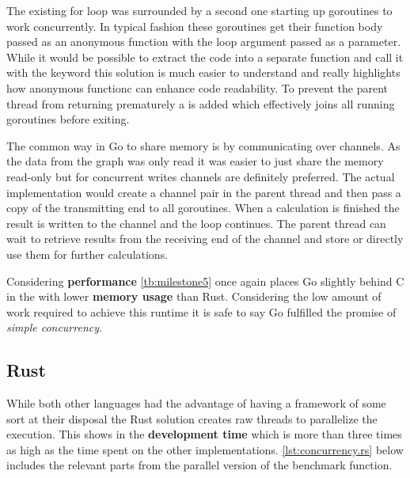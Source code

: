 The existing for loop was surrounded by a second one starting up \glspl{goroutine} to work concurrently. In typical fashion these \glspl{goroutine} get their function body passed as an anonymous function with the loop argument passed as a parameter. While it would be possible to extract the code into a separate function and call it with the  keyword this solution is much easier to understand and really highlights how anonymous functionc can enhance code readability. To prevent the parent thread from returning prematurely a  is added which effectively joins all running \glspl{goroutine} before exiting.

The common way in Go to share memory is by communicating over channels. As the data from the graph was only read it was easier to just share the memory read-only but for concurrent writes channels are definitely preferred. The actual implementation would create a channel pair in the parent thread and then pass a copy of the transmitting end to all \glspl{goroutine}. When a calculation is finished the result is written to the channel and the loop continues. The parent thread can wait to retrieve results from the receiving end of the channel and store or directly use them for further calculations.

Considering \textbf{performance} \autoref{tb:milestone5} once again places Go slightly behind C in the with lower \textbf{memory usage} than Rust. Considering the low amount of work required to achieve this runtime it is safe to say Go fulfilled the promise of \textit{simple concurrency}.

\subsection{Rust}
\label{subsec:Implementation::ParallelBenchmark::Rust}

While both other languages had the advantage of having a framework of some sort at their disposal the Rust solution creates raw threads to parallelize the execution. This shows in the \textbf{development time} which is more than three times as high as the time spent on the other implementations. \autoref{lst:concurrency.rs} below includes the relevant parts from the parallel version of the benchmark function.
\\


